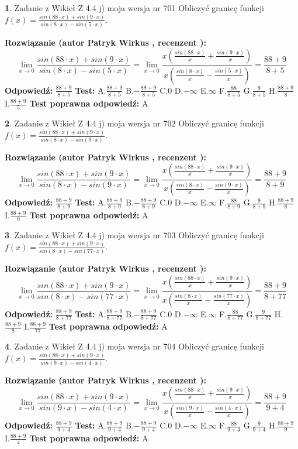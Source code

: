 \documentclass[12pt, a4paper]{article}
\theoremstyle{definition} %
\newtheorem{zad}{}
\newcommand{\zadStart}[1]{\begin{zad}#1\newline}
\newcommand{\zadStop}{\end{zad}}
\newcommand{\rozwStart}[2]{\noindent \textbf{Rozwiązanie (autor #1 , recenzent #2): }\newline}
\newcommand{\rozwStop}{\newline}
\newcommand{\odpStart}{\noindent \textbf{Odpowiedź:}\newline}
\newcommand{\odpStop}{\newline}
\newcommand{\testStart}{\noindent \textbf{Test:}\newline}
\newcommand{\testStop}{\newline}
\newcommand{\kluczStart}{\noindent \textbf{Test poprawna odpowiedź:}\newline}
\newcommand{\kluczStop}{\newline}
\begin{document}
\zadStart{Zadanie z Wikieł Z 4.4 j) moja wersja nr 701}
Obliczyć granicę funkcji $f(x)=\frac{sin(88\cdot x) +sin(9\cdot x)}{sin(8\cdot x) -sin(5\cdot x)}$.
\zadStop
\rozwStart{Patryk Wirkus}{}
$$\lim\limits_{x\to 0}\frac{sin(88\cdot x) +sin(9\cdot x)}{sin(8\cdot x) -sin(5\cdot x)}=\lim\limits_{x\to 0}\frac{x(\frac{sin(88\cdot x)}{x}+\frac{sin(9\cdot x)}{x})}{x(\frac{sin(8\cdot x)}{x}-\frac{sin(5\cdot x)}{x})}=\frac{88+9}{8+5}$$
\rozwStop
\odpStart
$\frac{88+9}{8+5}$
\odpStop
\testStart
A.$\frac{88+9}{8+5}$
B.$-\frac{88+9}{8+5}$
C.$0$
D.$-\infty$
E.$\infty$
F.$\frac{88}{8+5}$
G.$\frac{9}{8+5}$
H.$\frac{88+9}{8}$
I.$\frac{88+9}{5}$
\testStop
\kluczStart
A
\kluczStop



\zadStart{Zadanie z Wikieł Z 4.4 j) moja wersja nr 702}
Obliczyć granicę funkcji $f(x)=\frac{sin(88\cdot x) +sin(9\cdot x)}{sin(8\cdot x) -sin(9\cdot x)}$.
\zadStop
\rozwStart{Patryk Wirkus}{}
$$\lim\limits_{x\to 0}\frac{sin(88\cdot x) +sin(9\cdot x)}{sin(8\cdot x) -sin(9\cdot x)}=\lim\limits_{x\to 0}\frac{x(\frac{sin(88\cdot x)}{x}+\frac{sin(9\cdot x)}{x})}{x(\frac{sin(8\cdot x)}{x}-\frac{sin(9\cdot x)}{x})}=\frac{88+9}{8+9}$$
\rozwStop
\odpStart
$\frac{88+9}{8+9}$
\odpStop
\testStart
A.$\frac{88+9}{8+9}$
B.$-\frac{88+9}{8+9}$
C.$0$
D.$-\infty$
E.$\infty$
F.$\frac{88}{8+9}$
G.$\frac{9}{8+9}$
H.$\frac{88+9}{8}$
I.$\frac{88+9}{9}$
\testStop
\kluczStart
A
\kluczStop



\zadStart{Zadanie z Wikieł Z 4.4 j) moja wersja nr 703}
Obliczyć granicę funkcji $f(x)=\frac{sin(88\cdot x) +sin(9\cdot x)}{sin(8\cdot x) -sin(77\cdot x)}$.
\zadStop
\rozwStart{Patryk Wirkus}{}
$$\lim\limits_{x\to 0}\frac{sin(88\cdot x) +sin(9\cdot x)}{sin(8\cdot x) -sin(77\cdot x)}=\lim\limits_{x\to 0}\frac{x(\frac{sin(88\cdot x)}{x}+\frac{sin(9\cdot x)}{x})}{x(\frac{sin(8\cdot x)}{x}-\frac{sin(77\cdot x)}{x})}=\frac{88+9}{8+77}$$
\rozwStop
\odpStart
$\frac{88+9}{8+77}$
\odpStop
\testStart
A.$\frac{88+9}{8+77}$
B.$-\frac{88+9}{8+77}$
C.$0$
D.$-\infty$
E.$\infty$
F.$\frac{88}{8+77}$
G.$\frac{9}{8+77}$
H.$\frac{88+9}{8}$
I.$\frac{88+9}{77}$
\testStop
\kluczStart
A
\kluczStop



\zadStart{Zadanie z Wikieł Z 4.4 j) moja wersja nr 704}
Obliczyć granicę funkcji $f(x)=\frac{sin(88\cdot x) +sin(9\cdot x)}{sin(9\cdot x) -sin(4\cdot x)}$.
\zadStop
\rozwStart{Patryk Wirkus}{}
$$\lim\limits_{x\to 0}\frac{sin(88\cdot x) +sin(9\cdot x)}{sin(9\cdot x) -sin(4\cdot x)}=\lim\limits_{x\to 0}\frac{x(\frac{sin(88\cdot x)}{x}+\frac{sin(9\cdot x)}{x})}{x(\frac{sin(9\cdot x)}{x}-\frac{sin(4\cdot x)}{x})}=\frac{88+9}{9+4}$$
\rozwStop
\odpStart
$\frac{88+9}{9+4}$
\odpStop
\testStart
A.$\frac{88+9}{9+4}$
B.$-\frac{88+9}{9+4}$
C.$0$
D.$-\infty$
E.$\infty$
F.$\frac{88}{9+4}$
G.$\frac{9}{9+4}$
H.$\frac{88+9}{9}$
I.$\frac{88+9}{4}$
\testStop
\kluczStart
A
\kluczStop
\end{document}
